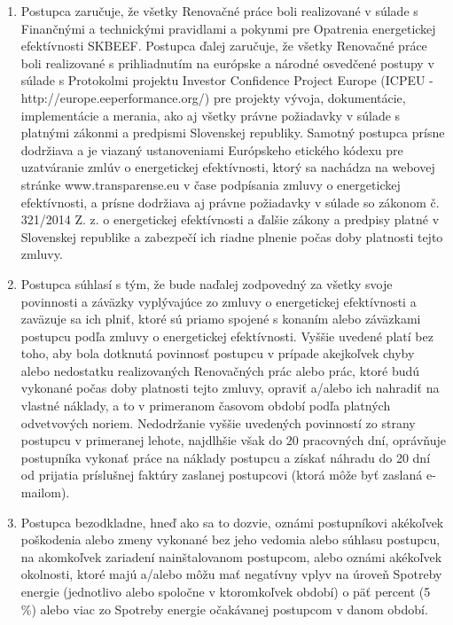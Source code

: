 \documentclass[a4paper]{article}
\begin{document}
\begin{multicols}{2}
\begin{enumerate}
    \item{Postupca zaručuje, že všetky Renovačné práce boli realizované v súlade s Finančnými a technickými pravidlami a pokynmi pre Opatrenia energetickej efektívnosti SKBEEF. Postupca ďalej zaručuje, že všetky Renovačné práce boli realizované s prihliadnutím na európske a národné osvedčené postupy v súlade s Protokolmi projektu Investor Confidence Project Europe (ICPEU - http://europe.eeperformance.org/) pre projekty vývoja, dokumentácie, implementácie a merania, ako aj všetky právne požiadavky v súlade s platnými zákonmi a predpismi Slovenskej republiky. Samotný postupca prísne dodržiava a je viazaný ustanoveniami Európskeho etického kódexu pre uzatváranie zmlúv o energetickej efektívnosti, ktorý sa nachádza na webovej stránke www.transparense.eu v čase podpísania zmluvy o energetickej efektívnosti, a prísne dodržiava aj právne požiadavky v súlade so zákonom č. 321/2014 Z. z. o energetickej efektívnosti a ďalšie zákony a predpisy platné v Slovenskej republike a zabezpečí ich riadne plnenie počas doby platnosti tejto zmluvy.}
    \item{Postupca súhlasí s tým, že bude naďalej zodpovedný za všetky svoje povinnosti a záväzky vyplývajúce zo zmluvy o energetickej efektívnosti a zaväzuje sa ich plniť, ktoré sú priamo spojené s konaním alebo záväzkami postupcu podľa zmluvy o energetickej efektívnosti. Vyššie uvedené platí bez toho, aby bola dotknutá povinnosť postupcu v prípade akejkoľvek chyby alebo nedostatku realizovaných Renovačných prác alebo prác, ktoré budú vykonané počas doby platnosti tejto zmluvy, opraviť a/alebo ich nahradiť na vlastné náklady, a to v primeranom časovom období podľa platných odvetvových noriem. Nedodržanie vyššie uvedených povinností zo strany postupcu v primeranej lehote, najdlhšie však do 20 pracovných dní, oprávňuje postupníka vykonať práce na náklady postupcu a získať náhradu do 20 dní od prijatia príslušnej faktúry zaslanej postupcovi (ktorá môže byť zaslaná e-mailom).}
    \item{Postupca bezodkladne, hneď ako sa to dozvie, oznámi postupníkovi akékoľvek poškodenia alebo zmeny vykonané bez jeho vedomia alebo súhlasu postupcu, na akomkoľvek zariadení nainštalovanom postupcom, alebo oznámi akékoľvek okolnosti, ktoré majú a/alebo môžu mať negatívny vplyv na úroveň Spotreby energie (jednotlivo alebo spoločne v ktoromkoľvek období) o päť percent (5 \%) alebo viac zo Spotreby energie očakávanej postupcom v danom období.}

\end{enumerate}
\end{multicols}
\end{document}
